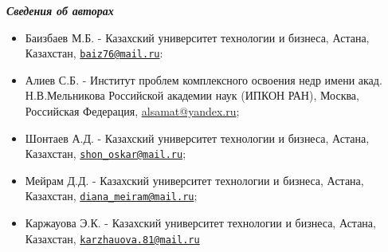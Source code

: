 \begin{center}
\emph{{\bfseries Сведения об авторах}}
\end{center}

\begin{itemize}
\item
Баизбаев М.Б. - Казахский университет технологии и бизнеса, Астана,
Казахстан, \href{mailto:baiz76@mail.ru}{\nolinkurl{baiz76@mail.ru}}:

\item
Алиев С.Б. - Институт проблем комплексного освоения недр имени акад.
Н.В.Мельникова Российской академии наук (ИПКОН РАН), Москва, Российская
Федерация, \href{mailto:baiz76@mail.ru}{alsamat@yandex.ru};

\item
Шонтаев А.Д. - Казахский университет технологии и бизнеса, Астана,
Казахстан,
\href{mailto:shon_oskar@mail.ru}{\nolinkurl{shon\_oskar@mail.ru}};

\item
Мейрам Д.Д. - Казахский университет технологии и бизнеса, Астана,
Казахстан,
\href{mailto:diana_meiram@mail.ru}{\nolinkurl{diana\_meiram@mail.ru}};

\item
Каржауова Э.К. - Казахский университет технологии и бизнеса, Астана,
Казахстан,
\href{mailto:karzhauova.81@mail.ru}{\nolinkurl{karzhauova.81@mail.ru}}
\end{itemize}
